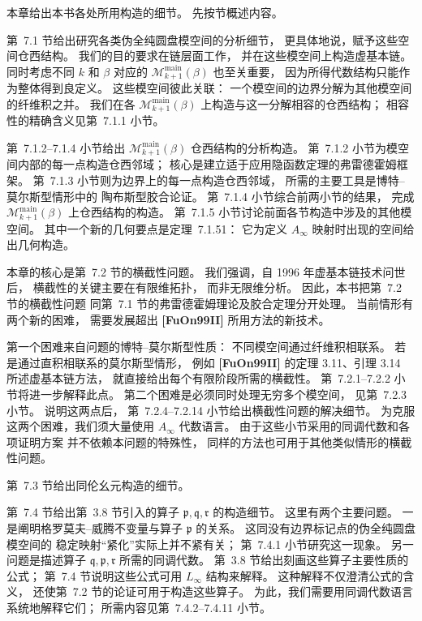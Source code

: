 
本章给出本书各处所用构造的细节。
先按节概述内容。

第~7.1 节给出研究各类伪全纯圆盘模空间的分析细节，
更具体地说，赋予这些空间仓西结构。
我们的目的要求在链层面工作，
并在这些模空间上构造虚基本链。
同时考虑不同 $k$ 和 $\beta$ 对应的
$\mathcal M^{\mathrm{main}}_{k+1}(\beta)$
也至关重要，
因为所得代数结构只能作为整体得到良定义。
这些模空间彼此关联：
一个模空间的边界分解为其他模空间的纤维积之并。
我们在各
$\mathcal M^{\mathrm{main}}_{k+1}(\beta)$
上构造与这一分解相容的仓西结构；
相容性的精确含义见第~7.1.1 小节。

第~7.1.2--7.1.4 小节给出
$\mathcal M^{\mathrm{main}}_{k+1}(\beta)$
仓西结构的分析构造。
第~7.1.2 小节为模空间内部的每一点构造仓西邻域；
核心是建立适于应用隐函数定理的弗雷德霍姆框架。
第~7.1.3 小节则为边界上的每一点构造仓西邻域，
所需的主要工具是博特--莫尔斯型情形中的
陶布斯型胶合论证。
第~7.1.4 小节综合前两小节的结果，
完成 $\mathcal M^{\mathrm{main}}_{k+1}(\beta)$
上仓西结构的构造。
第~7.1.5 小节讨论前面各节构造中涉及的其他模空间。
其中一个新的几何要点是定理~7.1.51：
它为定义 $A_\infty$ 映射时出现的空间给出几何构造。

本章的核心是第~7.2 节的横截性问题。
我们强调，自 1996 年虚基本链技术问世后，
横截性的关键主要在有限维拓扑，
而非无限维分析。
因此，本书把第~7.2 节的横截性问题
同第~7.1 节的弗雷德霍姆理论及胶合定理分开处理。
当前情形有两个新的困难，
需要发展超出 \textbf{[FuOn99II]} 所用方法的新技术。

第一个困难来自问题的博特--莫尔斯型性质：
不同模空间通过纤维积相联系。
若是通过直积相联系的莫尔斯型情形，
例如 \textbf{[FuOn99II]} 的定理 3.11、引理 3.14
所述虚基本链方法，
就直接给出每个有限阶段所需的横截性。
第~7.2.1--7.2.2 小节将进一步解释此点。
第二个困难是必须同时处理无穷多个模空间，
见第~7.2.3 小节。
说明这两点后，
第~7.2.4--7.2.14 小节给出横截性问题的解决细节。
为克服这两个困难，我们须大量使用 $A_\infty$ 代数语言。
由于这些小节采用的同调代数和各项证明方案
并不依赖本问题的特殊性，
同样的方法也可用于其他类似情形的横截性问题。

第~7.3 节给出同伦幺元构造的细节。

第~7.4 节给出第~3.8 节引入的算子
$\mathfrak p,\mathfrak q,\mathfrak r$ 的构造细节。
这里有两个主要问题。
一是阐明格罗莫夫--威腾不变量与算子
$\mathfrak p$ 的关系。
这同没有边界标记点的伪全纯圆盘模空间的
稳定映射“紧化”实际上并不紧有关；
第~7.4.1 小节研究这一现象。
另一问题是描述算子
$\mathfrak q,\mathfrak p,\mathfrak r$
所需的同调代数。
第~3.8 节给出刻画这些算子主要性质的公式；
第~7.4 节说明这些公式可用 $L_\infty$ 结构来解释。
这种解释不仅澄清公式的含义，
还使第~7.2 节的论证可用于构造这些算子。
为此，我们需要用同调代数语言系统地解释它们；
所需内容见第~7.4.2--7.4.11 小节。

